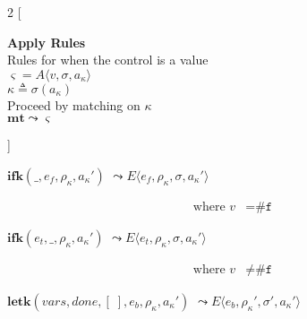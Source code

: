 \documentclass[12pt,draft]{article}
\newcommand{\falsesyn}{\texttt{\#f}}
\newcommand{\env}[0]{\rho}
\newcommand{\store}[0]{\sigma}
\newcommand{\kaddr}[0]{a_{\kappa}}
\newcommand{\kont}[0]{\kappa}
\newcommand{\state}[0]{\varsigma}
\newcommand{\E}[4]{E\langle #1 , #2 , #3 , #4 \rangle}
\newcommand{\A}[3]{A\langle #1 , #2 , #3 \rangle}
\begin{document}
\newpage

\newcommand{\kenv}[0]{\env_{\kappa}}
\newcommand{\lamenv}[0]{\env_{\lambda}}

\begin{multicols*}{2}
[
\begin{center}
\textbf{Apply Rules} \\
Rules for when the control is a value \\
$\state = \A{v}{\store}{\kaddr}$ \\
$\kont \triangleq \store(\kaddr)$ \\
Proceed by matching on $\kont$ \\
\vspace{5mm}
$\textbf{mt} \leadsto \state$
\end{center}
\vspace{-5mm}
]
\begin{center}
  $\textbf{ifk}(\_ , e_f , \kenv , \kaddr')$
  $\leadsto \E{e_f}{\kenv}{\store}{\kaddr'}$
\end{center}
\vspace{-7mm}
\begin{align*}
\text{where } v &= \falsesyn
\end{align*}
\begin{center}
  $\textbf{ifk}(e_t , \_ , \kenv, \kaddr')$
  $\leadsto \E{e_t}{\kenv}{\store}{\kaddr'}$
\end{center}
\vspace{-7mm}
\begin{align*}
\text{where } v &\not= \falsesyn
\end{align*}
\begin{center}
  $\textbf{letk}(vars , done , [\;] , e_b , \kenv , \kaddr')$
  $\leadsto \E{e_b}{\kenv'}{\store'}{\kaddr'}$
\end{center}
\vspace{-7mm}
\begin{align*}

\end{align*}
\end{multicols*}
\end{document}
